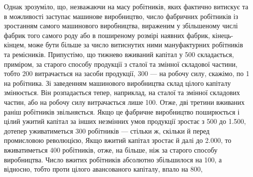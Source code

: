 Однак зрозуміло, що, незважаючи на масу робітників, яких фактично
витискує та в можливості заступає машинове виробництво,
число фабричних робітників із зростанням самого машинового виробництва,
вираженим у збільшеному числі фабрик того самого
роду або в поширеному розмірі наявних фабрик, кінець-кінцем,
може бути більше за число витиснутих ними мануфактурних робітників
та ремісників. Припустімо, що тижнево вживаний капітал
у 500 складається, приміром, за старого способу
продукції з  сталої та  змінної складової частини, тобто 200 витрачається на засоби продукції, 300 — на робочу силу, скажімо, по 1
на робітника. Зі заведенням машинового виробництва склад цілого
капіталу змінюється. Він розпадається тепер, наприклад, на 
сталої та  змінної складових частин, або на робочу силу витрачається
лише 100. Отже, дві третини вживаних
раніш робітників звільняється. Якщо це фабричне виробництво
поширюється і цілий ужитий капітал за інших незмінних умов
продукції зростає з 500 до 1.500, дотепер уживатиметься 300 робітників
— стільки ж, скільки й перед промисловою революцією,
Якщо вжитий капітал зростає й далі до 2.000, то вживатиметься
400 робітників, отже, на  більше, ніж за старого способу виробництва.
Число вжитих робітників абсолютно збільшилося на 100,
а відносно, тобто проти цілого авансованого капіталу, впало на 800,
\parbreak{}  %
